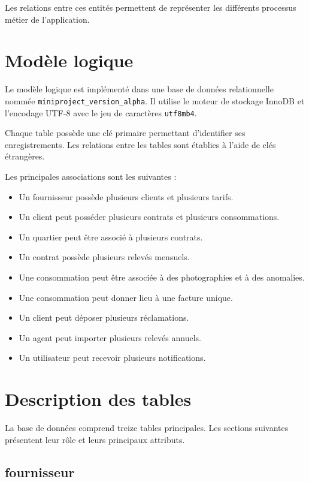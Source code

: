 Les relations entre ces entités permettent de représenter les différents processus métier de l'application.

\section{Modèle logique}

Le modèle logique est implémenté dans une base de données relationnelle nommée \texttt{miniproject\_version\_alpha}. Il utilise le moteur de stockage InnoDB et l'encodage UTF-8 avec le jeu de caractères \texttt{utf8mb4}.

Chaque table possède une clé primaire permettant d'identifier ses enregistrements. Les relations entre les tables sont établies à l'aide de clés étrangères.

Les principales associations sont les suivantes :

\begin{itemize}[leftmargin=*]
    \item Un fournisseur possède plusieurs clients et plusieurs tarifs.
    \item Un client peut posséder plusieurs contrats et plusieurs consommations.
    \item Un quartier peut être associé à plusieurs contrats.
    \item Un contrat possède plusieurs relevés mensuels.
    \item Une consommation peut être associée à des photographies et à des anomalies.
    \item Une consommation peut donner lieu à une facture unique.
    \item Un client peut déposer plusieurs réclamations.
    \item Un agent peut importer plusieurs relevés annuels.
    \item Un utilisateur peut recevoir plusieurs notifications.
\end{itemize}

\section{Description des tables}

La base de données comprend treize tables principales. Les sections suivantes présentent leur rôle et leurs principaux attributs.

\subsection{fournisseur}

